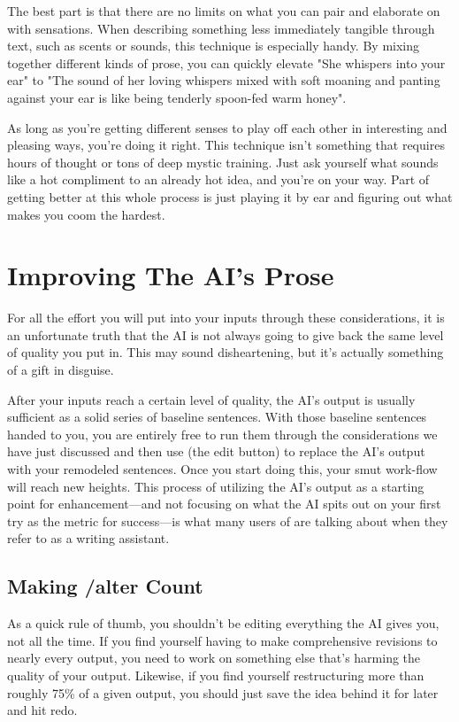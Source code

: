 ﻿\documentclass[Coomer-main.tex]{subfiles}
\begin{document}
The best part is that there are no limits on what you can pair and elaborate on with sensations. When describing something less immediately tangible through text, such as scents or sounds, this technique is especially handy. By mixing together different kinds of prose, you can quickly elevate "She whispers into your ear" to "The sound of her loving whispers mixed with soft moaning and panting against your ear is like being tenderly spoon-fed warm honey".

As long as you're getting different senses to play off each other in interesting and pleasing ways, you're doing it right. This technique isn't something that requires hours of thought or tons of deep mystic training. Just ask yourself what sounds like a hot compliment to an already hot idea, and you're on your way. Part of getting better at this whole process is just playing it by ear and figuring out what makes you coom the hardest.

\section{Improving The AI's Prose}

For all the effort you will put into your inputs through these considerations, it is an unfortunate truth that the AI is not always going to give back the same level of quality you put in. This may sound disheartening, but it's actually something of a gift in disguise.


After your inputs reach a certain level of quality, the AI's output is usually sufficient as a solid series of baseline sentences. With those baseline sentences handed to you, you are entirely free to run them through the considerations we have just discussed and then use \alt (the edit button) to replace the AI’s output with your remodeled sentences. Once you start doing this, your smut work-flow will reach new heights. This process of utilizing the AI's output as a starting point for enhancement—and not focusing on what the AI spits out on your first try as the metric for success—is what many users of \aid are talking about when they refer to \aid as a writing assistant.

\subsection{Making /alter Count}

As a quick rule of thumb, you shouldn't be editing everything the AI gives you, not all the time. If you find yourself having to make comprehensive revisions to nearly every output, you need to work on something else that's harming the quality of your output. Likewise, if you find yourself restructuring more than roughly 75\% of a given output, you should just save the idea behind it for later and hit redo.
\end{document}
